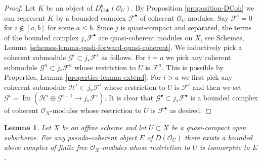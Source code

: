 \documentclass{stacks-project}
\theoremstyle{plain}
\newtheorem{lemma}[subsection]{Lemma}
\theoremstyle{definition}
\theoremstyle{remark}
\numberwithin{equation}{subsection}
\def\Im{\mathop{\mathrm{Im}}}
\begin{document}
\begin{proof}
Let $K$ be an object of $D^b_{\textit{Coh}}(\mathcal{O}_U)$.
By Proposition \ref{proposition-DCoh} we can represent $K$ by a bounded
complex $\mathcal{F}^\bullet$ of coherent $\mathcal{O}_U$-modules.
Say $\mathcal{F}^i = 0$ for $i \not \in [a, b]$ for some $a \leq b$.
Since $j$ is quasi-compact and separated, the terms of the bounded complex
$j_*\mathcal{F}^\bullet$ are quasi-coherent modules on $X$, see
Schemes, Lemma \ref{schemes-lemma-push-forward-quasi-coherent}.
We inductively pick a coherent submodule
$\mathcal{G}^i \subset j_*\mathcal{F}^i$ as follows.
For $i = a$ we pick any coherent submodule
$\mathcal{G}^a \subset j_*\mathcal{F}^a$ whose restriction
to $U$ is $\mathcal{F}^a$. This is possible by
Properties, Lemma \ref{properties-lemma-extend}.
For $i > a$ we first pick any coherent submodule
$\mathcal{H}^i \subset j_*\mathcal{F}^i$
whose restriction to $U$ is $\mathcal{F}^i$
and then we set
$\mathcal{G}^i = \Im(\mathcal{H}^i \oplus \mathcal{G}^{i - 1}
\to j_*\mathcal{F}^i)$. It is clear that
$\mathcal{G}^\bullet \subset j_*\mathcal{F}^\bullet$
is a bounded complex of coherent $\mathcal{O}_X$-modules
whose restriction to $U$ is $\mathcal{F}^\bullet$ as desired.
\end{proof}

\begin{lemma}
\label{lemma-lift-pseudo-coherent}
Let $X$ be an affine scheme and let $U \subset X$ be a quasi-compact
open subscheme. For any pseudo-coherent object $E$ of $D(\mathcal{O}_U)$
there exists a bounded above complex of finite free $\mathcal{O}_X$-modules 
whose restriction to $U$ is isomorphic to $E$.
\end{lemma}
\end{document}
